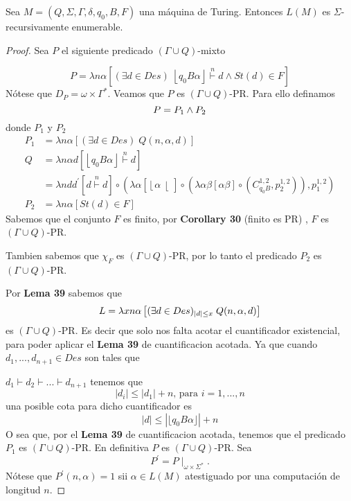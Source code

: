   \begin{theorem}
  	Sea $M=\left( Q,\Sigma ,\Gamma ,\delta ,q_{0},B,F\right) $ una máquina de Turing.
    Entonces $L(M)$ es $\Sigma $-recursivamente enumerable.

  \begin{proof}
     Sea $P$ el siguiente predicado $(\Gamma \cup Q)$-mixto

    \[
      P = \lambda n\alpha \left[ (\exists d\in Des)\;\left\lfloor q_{0}B\alpha \right\rfloor \overset{n}{\vdash }d\wedge
        St(d)\in F\right]
    \]
    Nótese que $D_{P}=\omega \times \Gamma ^{\ast }$. Veamos que $P$ es $(\Gamma \cup Q)$-PR. Para ello definamos
    \[
      P = P_1 \land P_2 \\[20pt]
    \]
    donde $P_1$ y $P_2$
    \begin{align*}
      P_1 &=  \lambda n\alpha \left[ (\exists d\in Des)\; Q(n, \alpha, d)\right] \\[10pt]
        Q &=  \lambda n \alpha d \left[ \left\lfloor q_{0}B\alpha \right\rfloor \overset{n}{\vdash }d \right] \\
          &=  \lambda n d d^{\prime} \left[ d \overset{n}{\vdash}d \right]
                \circ (
                  \lambda \alpha \left[ \left\lfloor \alpha \right\lfloor \right]
                    \circ(
                      \lambda \alpha \beta \left[ \alpha \beta \right]
                        \circ (
                          C_{q_0 B}^{1,2},
                          p_{2}^{1,2}
                        )
                  ),
                  p_{1}^{1,2}
                ) \\[30pt]
      P_2 &=  \lambda n\alpha \left[ St(d)\in F \right]
    \end{align*}
    Sabemos que el conjunto $F$ es finito, por \textbf{Corollary 30} (finito es PR) , $F$ es $(\Gamma \cup Q)$-PR.

    \noindent Tambien sabemos que $\chi_F$ es $(\Gamma \cup Q)$-PR, por lo tanto el predicado $P_2$ es
    $(\Gamma \cup Q)$-PR.

    \noindent Por \textbf{Lema 39} sabemos que
    \[
      L = \lambda x n\alpha \left[ (\exists d\in Des)_{|d| \leq x}\; Q(n, \alpha, d)\right] \\[10pt]
    \]
    es $(\Gamma \cup Q)$-PR.
    Es decir que solo nos falta acotar el cuantificador existencial, para poder aplicar el \textbf{Lema 39} de
    cuantificacion acotada. Ya que cuando \( d_{1},...,d_{n+1}\in Des\) son tales que

    \noindent \(d_{1}\vdash d_{2}\vdash ...\vdash d_{n+1}\) tenemos que
    \[
      \displaystyle \left\vert d_{i}\right\vert \leq \left\vert d_{1}\right\vert +n\text{, para } i=1,...,n
    \]
    una posible cota para dicho cuantificador es
    \[
      |d| \leq |\lfloor q_{0}B\alpha \rfloor| + n
    \]
    O sea que, por el \textbf{Lema 39} de cuantificacion acotada, tenemos que el predicado $P_1$ es
    $(\Gamma \cup Q)$-PR. En definitiva $P$ es $(\Gamma \cup Q)$-PR.
    Sea
    \[
      P^{\prime }=P\mid _{\omega \times \Sigma ^{\ast }}.
    \]
    Nótese que $P^{\prime }(n,\alpha )=1$ sii
    $\alpha \in L(M) $ atestiguado por una computación de longitud $n$.


\end{proof}
\end{theorem}
